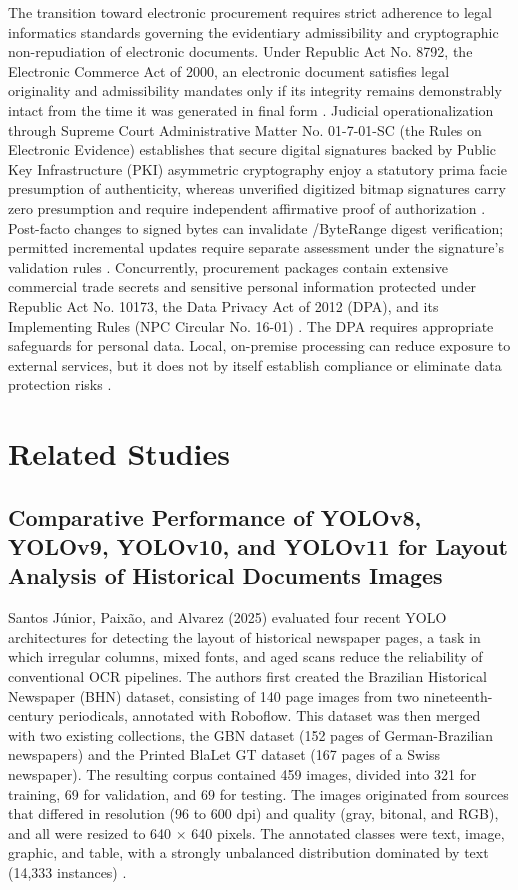 The transition toward electronic procurement requires strict adherence to legal informatics standards governing the evidentiary admissibility and cryptographic non-repudiation of electronic documents.
Under Republic Act No. 8792, the Electronic Commerce Act of 2000, an electronic document satisfies legal originality and admissibility mandates only if its integrity remains demonstrably intact from the time it was generated in final form \cite{ref10}.
Judicial operationalization through Supreme Court Administrative Matter No. 01-7-01-SC (the Rules on Electronic Evidence) establishes that secure digital signatures backed by Public Key Infrastructure (PKI) asymmetric cryptography enjoy a statutory prima facie presumption of authenticity, whereas unverified digitized bitmap signatures carry zero presumption and require independent affirmative proof of authorization \cite{ref11}.
Post-facto changes to signed bytes can invalidate /ByteRange digest verification; permitted incremental updates require separate assessment under the signature's validation rules \cite{ref42, ref11}.
Concurrently, procurement packages contain extensive commercial trade secrets and sensitive personal information protected under Republic Act No. 10173, the Data Privacy Act of 2012 (DPA), and its Implementing Rules (NPC Circular No. 16-01) \cite{ref6, ref47}.
The DPA requires appropriate safeguards for personal data. Local, on-premise processing can reduce exposure to external services, but it does not by itself establish compliance or eliminate data protection risks \cite{ref6, ref47}.

\section{Related Studies}

\subsection{Comparative Performance of YOLOv8, YOLOv9, YOLOv10, and YOLOv11 for Layout Analysis of Historical Documents Images}

Santos Júnior, Paixão, and Alvarez (2025) evaluated four recent YOLO architectures for detecting the layout of historical newspaper pages, a task in which irregular columns, mixed fonts, and aged scans reduce the reliability of conventional OCR pipelines.
The authors first created the Brazilian Historical Newspaper (BHN) dataset, consisting of 140 page images from two nineteenth-century periodicals, annotated with Roboflow.
This dataset was then merged with two existing collections, the GBN dataset (152 pages of German-Brazilian newspapers) and the Printed BlaLet GT dataset (167 pages of a Swiss newspaper).
The resulting corpus contained 459 images, divided into 321 for training, 69 for validation, and 69 for testing.
The images originated from sources that differed in resolution (96 to 600 dpi) and quality (gray, bitonal, and RGB), and all were resized to 640 $\times$ 640 pixels.
The annotated classes were text, image, graphic, and table, with a strongly unbalanced distribution dominated by text (14,333 instances) \cite{ref48}.

